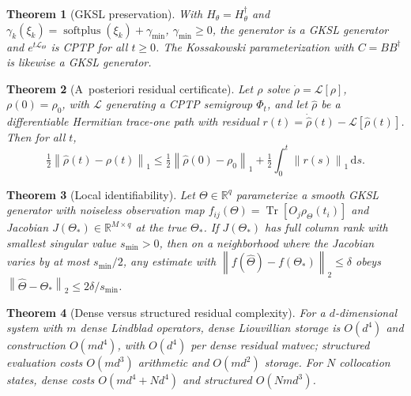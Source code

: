 \documentclass[twocolumn,aps,prxquantum,superscriptaddress,nofootinbib,floatfix,longbibliography]{revtex4-2}
\newtheorem{theorem}{Theorem}
\DeclareMathOperator{\Tr}{Tr}
\DeclareMathOperator{\softplus}{softplus}
\newcommand{\R}{\mathbb{R}}
\newcommand{\calL}{\mathcal{L}}
\newcommand{\dd}{\mathrm{d}}
\newcommand{\norm}[1]{\left\lVert #1 \right\rVert}
\newcommand{\rhohat}{\widehat{\rho}}
\newcommand{\Thetahat}{\widehat{\Theta}}
\begin{document}
\begin{theorem}[GKSL preservation]
\label{thm:cptp_generator}
With $H_\theta=H_\theta^\dagger$ and $\gamma_k(\xi_k)=\softplus(\xi_k)+\gamma_{\min}$, $\gamma_{\min}\ge0$, the generator is a GKSL generator and $e^{t\calL_\Theta}$ is CPTP for all $t\ge0$. The Kossakowski parameterization with $C=BB^\dagger$ is likewise a GKSL generator.
\end{theorem}

\begin{theorem}[A~posteriori residual certificate]
\label{thm:certificate}
Let $\rho$ solve $\dot\rho=\calL[\rho]$, $\rho(0)=\rho_0$, with $\calL$ generating a CPTP semigroup $\Phi_t$, and let $\rhohat$ be a differentiable Hermitian trace-one path with residual $r(t)=\dot\rhohat(t)-\calL[\rhohat(t)]$. Then for all $t$,
\begin{equation}
    \tfrac12\norm{\rhohat(t)-\rho(t)}_1\le\tfrac12\norm{\rhohat(0)-\rho_0}_1+\tfrac12\int_0^t\norm{r(s)}_1\,\dd s.
    \label{eq:certificate}
\end{equation}
\end{theorem}

\begin{theorem}[Local identifiability]
\label{thm:identifiability}
Let $\Theta\in\R^q$ parameterize a smooth GKSL generator with noiseless observation map $f_{ij}(\Theta)=\Tr[O_j\rho_\Theta(t_i)]$ and Jacobian $J(\Theta_*)\in\R^{M\times q}$ at the true $\Theta_*$. If $J(\Theta_*)$ has full column rank with smallest singular value $s_{\min}>0$, then on a neighborhood where the Jacobian varies by at most $s_{\min}/2$, any estimate with $\norm{f(\Thetahat)-f(\Theta_*)}_2\le\delta$ obeys $\norm{\Thetahat-\Theta_*}_2\le2\delta/s_{\min}$.
\end{theorem}

\begin{theorem}[Dense versus structured residual complexity]
\label{thm:compiler}
For a $d$-dimensional system with $m$ dense Lindblad operators, dense Liouvillian storage is $O(d^4)$ and construction $O(md^4)$, with $O(d^4)$ per dense residual matvec; structured evaluation costs $O(md^3)$ arithmetic and $O(md^2)$ storage. For $N$ collocation states, dense costs $O(md^4+Nd^4)$ and structured $O(Nmd^3)$.
\end{theorem}
\end{document}
